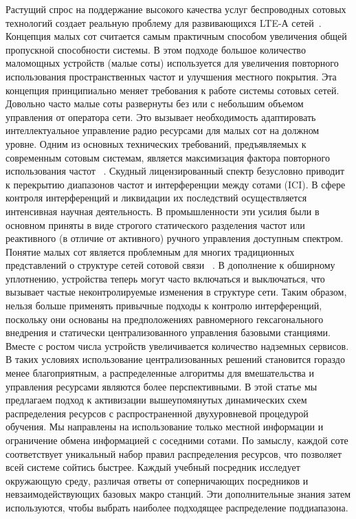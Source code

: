 Растущий спрос на поддержание высокого качества услуг беспроводных сотовых технологий создает реальную проблему для развивающихся LTE-А сетей~\cite{TS36.300}.
Концепция малых сот считается самым практичным способом увеличения общей пропускной способности системы. В этом подходе большое количество маломощных устройств (малые соты) используется для увеличения повторного использования пространственных частот и улучшения местного покрытия. Эта концепция принципиально меняет требования к работе системы сотовых сетей. Довольно часто малые соты развернуты без или с небольшим объемом управления от оператора сети. Это вызывает необходимость адаптировать интеллектуальное управление радио ресурсами для малых сот на должном уровне.
Одним из основных технических требований, предъявляемых к современным сотовым системам, является максимизация фактора повторного использования частот ~\cite{M.1645}. Скудный лицензированный спектр безусловно приводит к перекрытию диапазонов частот и интерференции между сотами (ICI). В сфере контроля интерференций и ликвидации их последствий осуществляется интенсивная научная деятельность. В промышленности эти усилия были в основном приняты в виде строгого статического разделения частот или реактивного (в отличие от активного) ручного управления доступным спектром.
Понятие малых сот является проблемным для многих традиционных представлений о структуре сетей сотовой связи ~\cite{6211486}. В дополнение к обширному уплотнению, устройства теперь могут часто включаться и выключаться, что вызывает частые неконтролируемые изменения в структуре сети. Таким образом, нельзя больше применять привычные подходы к контролю интерференций, поскольку они основаны на предположениях равномерного гексагонального внедрения и статически централизованного управления базовыми станциями. Вместе с ростом числа устройств увеличивается количество надземных сервисов. В таких условиях использование централизованных решений становится гораздо менее благоприятным, а распределенные алгоритмы для вмешательства и управления ресурсами являются более перспективными.
В этой статье мы предлагаем подход к активизации вышеупомянутых динамических схем распределения ресурсов с распространенной двухуровневой процедурой обучения. Мы направлены на использование только местной информации и ограничение обмена информацией с соседними сотами. По замыслу, каждой соте соответствует уникальный набор правил распределения ресурсов, что позволяет всей системе сойтись быстрее. Каждый учебный посредник исследует окружающую среду, различая ответы от соперничающих посредников и невзаимодействующих базовых макро станций. Эти дополнительные знания затем используются, чтобы выбрать наиболее подходящее распределение поддиапазона.
